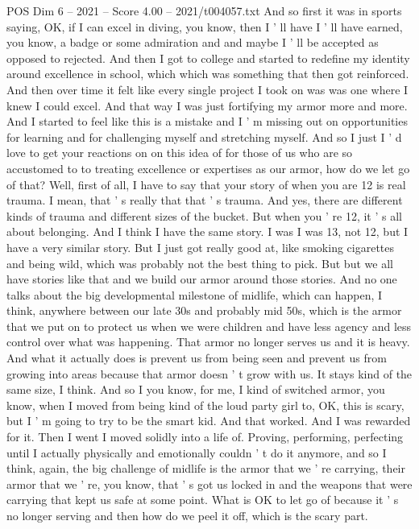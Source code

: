 \begin{textsample}{POS Dim 6 – 2021 – Score 4.00 – 2021/t004057.txt}
And so first it was in sports saying, OK, if I can excel in diving, you know, then I ' ll have I ' ll have earned, you know, a badge or some admiration and and maybe I ' ll be accepted as opposed to rejected.
And then I got to college and started to redefine my identity around excellence in school, which which was something that then got reinforced.
And then over time it felt like every single project I took on was was one where I knew I could excel.
And that way I was just fortifying my armor more and more.
And I started to feel like this is a mistake and I ' m missing out on opportunities for learning and for challenging myself and stretching myself.
And so I just I ' d love to get your reactions on on this idea of for those of us who are so accustomed to to treating excellence or expertises as our armor, how do we let go of that?
Well, first of all, I have to say that your story of when you are 12 is real trauma.
I mean, that ' s really that that ' s trauma.
And yes, there are different kinds of trauma and different sizes of the bucket.
But when you ' re 12, it ' s all about belonging.
And I think I have the same story.
I was I was 13, not 12, but I have a very similar story.
But I just got really good at, like smoking cigarettes and being wild, which was probably not the best thing to pick.
But but we all have stories like that and we build our armor around those stories.
And no one talks about the big developmental milestone of midlife, which can happen, I think, anywhere between our late 30s and probably mid 50s, which is the armor that we put on to protect us when we were children and have less agency and less control over what was happening.
That armor no longer serves us and it is heavy.
And what it actually does is prevent us from being seen and prevent us from growing into areas because that armor doesn ' t grow with us.
It stays kind of the same size, I think.
And so I you know, for me, I kind of switched armor, you know, when I moved from being kind of the loud party girl to, OK, this is scary, but I ' m going to try to be the smart kid.
And that worked.
And I was rewarded for it.
Then I went I moved solidly into a life of.
Proving, performing, perfecting until I actually physically and emotionally couldn ' t do it anymore, and so I think, again, the big challenge of midlife is the armor that we ' re carrying, their armor that we ' re, you know, that ' s got us locked in and the weapons that were carrying that kept us safe at some point.
What is OK to let go of because it ' s no longer serving and then how do we peel it off, which is the scary part.

\end{textsample}
